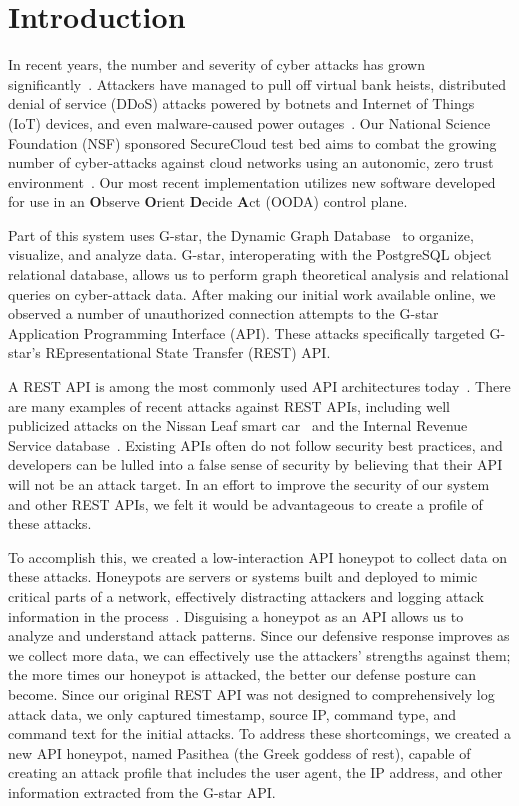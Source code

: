 
\section{Introduction} \label{intro}

In recent years, the number and severity of cyber attacks has grown significantly~\cite{Symantec-Threat-Report,IBM-XForce-Report}. 
Attackers have managed to pull off virtual bank heists, distributed denial of service (DDoS) attacks powered by botnets and Internet of Things (IoT) devices, and even malware-caused power outages~\cite{IBM-XForce-Report}. 
Our National Science Foundation (NSF) sponsored SecureCloud test bed aims to combat the growing number of cyber-attacks against cloud networks using an autonomic, zero trust environment~\cite{7796146}.  
Our most recent implementation utilizes new software developed for use in an {\textbf O}bserve {\textbf O}rient {\textbf D}ecide {\textbf A}ct (OODA) control plane.

Part of this system uses G-star, the Dynamic Graph Database~\cite{GStar} to organize, visualize, and analyze data. 
G-star, interoperating with the PostgreSQL object relational database, allows us to perform graph theoretical analysis and relational queries on cyber-attack data.  
After making our initial work available online, we observed a number of unauthorized connection attempts to the G-star Application Programming Interface (API).  
These attacks specifically targeted G-star's REpresentational State Transfer (REST) API.

A REST API is among the most commonly used API architectures today~\cite{REST-API-use}.
There are many examples of recent attacks against REST APIs, including well publicized attacks on the Nissan Leaf smart car~\cite{Nissan-Leaf} and the Internal Revenue Service database~\cite{IRS}.  
Existing APIs often do not follow security best practices, and developers can be lulled into a false sense of security by believing that their API will not be an attack target.  
In an effort to improve the security of our system and other REST APIs, we felt it would be advantageous to create a profile of these attacks.

To accomplish this, we created a low-interaction API honeypot to collect data on these attacks.
Honeypots are servers or systems built and deployed to mimic critical parts of a network, effectively distracting attackers and logging attack information in the process~\cite{honeypot-Def}.
Disguising a honeypot as an API allows us to analyze and understand attack patterns.
Since our defensive response improves as we collect more data, we can effectively use the attackers' strengths against them; the more times our honeypot is attacked, the better our defense posture can become.  
Since our original REST API was not designed to comprehensively log attack data, we only captured timestamp, source IP, command type, and command text for the initial attacks.  
To address these shortcomings, we created a new API honeypot, named Pasithea (the Greek goddess of rest), capable of creating an attack profile that includes the user agent, the IP address, and other information extracted from the G-star API.

